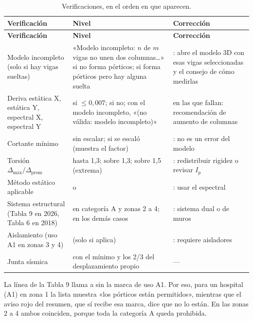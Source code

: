 \begin{longtable}{L{3.6cm}L{5.4cm}L{4.8cm}}
	\caption{Verificaciones, en el orden en que aparecen.} \label{tab:sis-verificaciones} \\
	\hline
	\textbf{Verificación} & \textbf{Nivel} & \textbf{Corrección} \\ \hline
	\endfirsthead
	\hline
	\textbf{Verificación} & \textbf{Nivel} & \textbf{Corrección} \\ \hline
	\endhead
	\hline
	\endfoot
	Modelo incompleto (solo si hay vigas sueltas) &  «Modelo incompleto: $n$ de $m$ vigas no unen dos
	columnas\ldots» si no forma pórticos;  si forma pórticos pero hay alguna suelta & : abre el
	modelo 3D con esas vigas seleccionadas y el consejo de cómo medirlas \\
	Deriva estática X, estática Y, espectral X, espectral Y &  si $\le 0{,}007$;  si no; con el
	modelo incompleto,  «(no válida: modelo incompleto)» &  en las que fallan: recomendación de
	aumento de columnas \\
	Cortante mínimo &  sin escalar;  si se escaló (muestra el factor) & : no es un error
	del modelo \\
	Torsión $\Delta_{\text{máx}}/\Delta_{\text{prom}}$ &  hasta 1,3;  sobre 1,3;  sobre
	1,5 (extrema) & : redistribuir rigidez o revisar $I_p$ \\
	Método estático aplicable &  o  & : usar el espectral \\
	Sistema estructural (Tabla 9 en 2026, Tabla 6 en 2018) &  en categoría A y zonas 2 a 4;  en los
	demás casos & : sistema dual o de muros \\
	Aislamiento (uso A1 en zonas 3 y 4) &  (solo si aplica) & : requiere aisladores \\
	Junta sísmica &  con el mínimo y los 2/3 del desplazamiento propio & --- \\
\end{longtable}

La línea de la Tabla 9 llama a  sin la marca de uso A1. Por eso, para un hospital
(A1) en zona 1 la lista muestra «los pórticos están permitidos», mientras que el aviso rojo del resumen, que sí recibe
esa marca, dice que no lo están. En las zonas 2 a 4 ambos coinciden, porque toda la categoría A queda prohibida.

